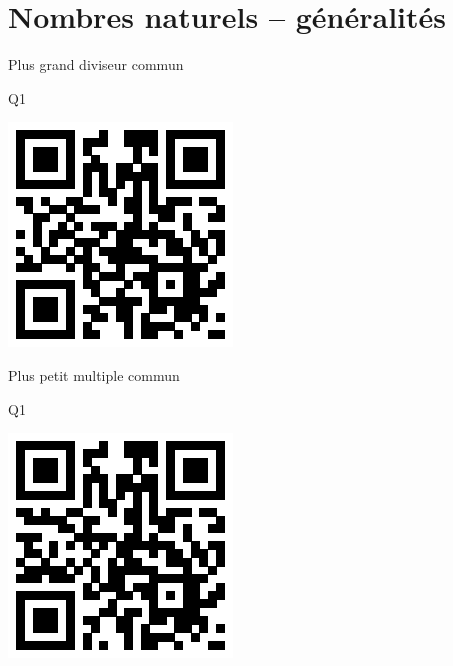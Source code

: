 \documentclass[a4paper,11pt]{report}
\begin{document}
\newcommand{\chapterName}{Quiz Moodle}
\newcommand{\serieName}{QR-code}
\section*{Nombres naturels -- généralités}
\begin{qmun}{Plus grand diviseur commun}{
	\begin{center}
		Q1

		\includegraphics[scale=1]{img/no0ng/nepgdc/nepgdc_1}
	\end{center}
}
\end{qmun}

\begin{qmun}{Plus petit multiple commun}{
	\begin{center}
		Q1

		\includegraphics[scale=1]{img/no0ng/neppmc/neppmc_1}
	\end{center}
}
\end{qmun}
\end{document}
